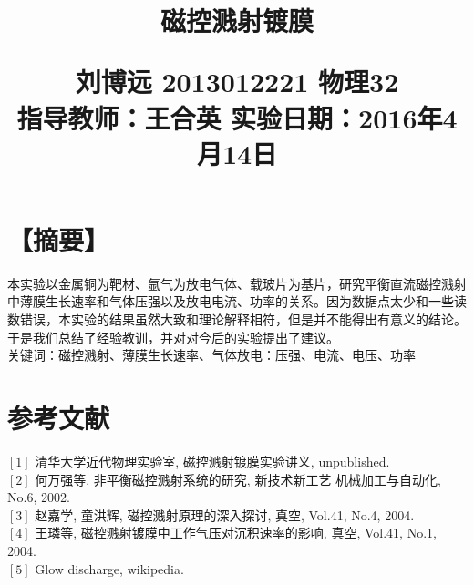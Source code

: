 \documentclass[10.5pt,a4paper]{ctexart}
\begin{document}
\fontsize{10.5pt}{15.75pt}\selectfont %
\title{磁控溅射镀膜\\
\begin{normalsize}
刘博远 2013012221 物理32\\指导教师：王合英 \quad 实验日期：2016年4月14日
\end{normalsize}
}
\date{}
\author{}
\maketitle


\section*{【摘要】}
本实验以金属铜为靶材、氩气为放电气体、载玻片为基片，研究平衡直流磁控溅射中薄膜生长速率和气体压强以及放电电流、功率的关系。因为数据点太少和一些读数错误，本实验的结果虽然大致和理论解释相符，但是并不能得出有意义的结论。于是我们总结了经验教训，并对对今后的实验提出了建议。\\
\indent 关键词：磁控溅射、薄膜生长速率、气体放电：压强、电流、电压、功率
\section{参考文献}
\noindent
$[1]$ 清华大学近代物理实验室, 磁控溅射镀膜实验讲义, unpublished.\\
$[2]$ 何万强等, 非平衡磁控溅射系统的研究, 新技术新工艺 机械加工与自动化, No.6, 2002.\\
$[3]$ 赵嘉学, 童洪辉, 磁控溅射原理的深入探讨, 真空, Vol.41, No.4, 2004.\\
$[4]$ 王璘等, 磁控溅射镀膜中工作气压对沉积速率的影响, 真空, Vol.41, No.1, 2004.\\
$[5]$ Glow discharge, wikipedia. 
\end{document}
